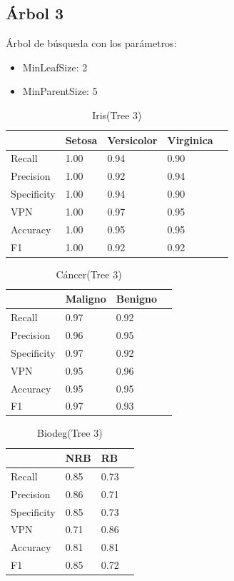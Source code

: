 \documentclass[a4paper,openwrite,12pt]{article}
\begin{document}
\subsection{Árbol 3}
Árbol de búsqueda con los parámetros:

\begin{itemize}
    \item MinLeafSize: 2
    \item MinParentSize: 5
\end{itemize}

\begin{table}[H]
\centering
\begin{tabular}{@{}lllll@{}}
\toprule
            & Setosa & Versicolor & Virginica &  \\ \midrule
Recall      & 1.00   & 0.94       & 0.90      &  \\
Precision   & 1.00   & 0.92       & 0.94      &  \\
Specificity & 1.00   & 0.94       & 0.90      &  \\
VPN         & 1.00   & 0.97       & 0.95      &  \\
Accuracy    & 1.00   & 0.95       & 0.95      &  \\
F1          & 1.00   & 0.92       & 0.92      &  \\ \bottomrule
\end{tabular}
\caption{Iris(Tree 3)}
\end{table}


\begin{table}[H]
\centering
\begin{tabular}{@{}llll@{}}
\toprule
            & Maligno & Benigno &  \\ \midrule
Recall      & 0.97    & 0.92    &  \\
Precision   & 0.96    & 0.95    &  \\
Specificity & 0.97    & 0.92    &  \\
VPN         & 0.95    & 0.96    &  \\
Accuracy    & 0.95    & 0.95    &  \\
F1          & 0.97    & 0.93    &  \\ \bottomrule
\end{tabular}
\caption{Cáncer(Tree 3)}
\end{table}

\begin{table}[H]
\centering
\begin{tabular}{@{}llll@{}}
\toprule
            & NRB &   RB &  \\ \midrule
Recall      & 0.85    & 0.73    &  \\
Precision   & 0.86    & 0.71    &  \\
Specificity & 0.85    & 0.73    &  \\
VPN         & 0.71    & 0.86    &  \\
Accuracy    & 0.81    & 0.81    &  \\
F1          & 0.85    & 0.72    &  \\ \bottomrule
\end{tabular}
\caption{Biodeg(Tree 3)}
\end{table}
\end{document}
